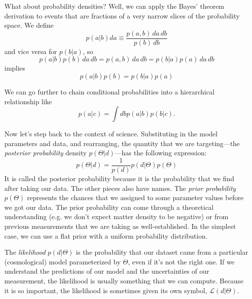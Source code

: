 What about probability densities?  Well, we can apply the Bayes' theorem derivation to events that are fractions of a very narrow slices of the probability space.  We define
\begin{equation}
  p(a|b) da  \equiv \frac{p(a,b)\, da \,db}{ p(b)\, db}
\end{equation}
and vice versa for $p(b|a)$, so
\begin{equation}
  p(a|b) p(b)\, da\, db = p(a,b)\, da\, db = p(b|a) p(a) \, da\, db
\end{equation}
implies
\begin{equation}
  p(a|b) p(b) =  p(b|a) p(a)
\end{equation}

We can go further to chain conditional probabilities into a hierarchical relationship like
\begin{equation}
  p(a|c) = \int db p(a|b) p(b|c).
\end{equation}


Now let's step back to the context of science.  Substituting in the model parameters and data, and rearranging, the quantity that we are targeting---the \textit{posterior probability} density $p(\Theta | d )$---has the following expression:
\begin{equation}
  p(\Theta | d ) = \frac{1}{p(d)} p(d | \Theta) p(\Theta) \label{eqn:bayes_density}
\end{equation}
It is called the posterior probability because it is the probability that we find after taking our data.  The other pieces also have names. The \textit{prior probability} $p(\Theta)$ represents the chances that we assigned to some parameter values before we got our data.  The prior probability can come through a theoretical understanding (e.g. we don't expect matter density to be negative) or from previous measurements that we are taking as well-established.  In the simplest case, we can use a flat prior with a uniform probability distribution.

The \textit{likelihood} $p(d | \Theta)$ is the probability that our dataset came from a particular (cosmological) model parameterized by $\Theta$, even if it's not the right one.  If we understand the predictions of our model and the uncertainties of our measurement, the likelihood is usually something that we can compute.  Because it is so important, the likelihood is sometimes given its own symbol, $\mathcal{ L}(d|\Theta)$.

